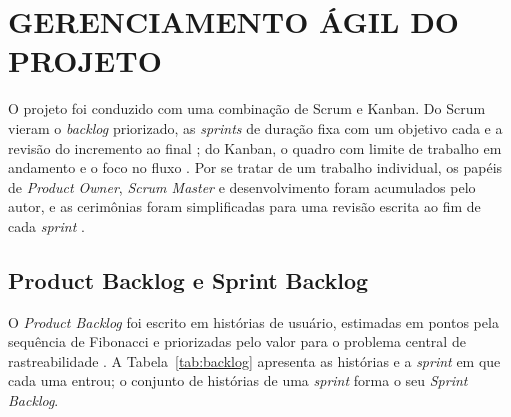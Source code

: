 \chapter{GERENCIAMENTO ÁGIL DO PROJETO}

O projeto foi conduzido com uma combinação de Scrum e Kanban. Do Scrum vieram o \textit{backlog} priorizado, as \textit{sprints} de duração fixa com um objetivo cada e a revisão do incremento ao final \cite{schwaber2020}; do Kanban, o quadro com limite de trabalho em andamento e o foco no fluxo \cite{anderson2011}. Por se tratar de um trabalho individual, os papéis de \textit{Product Owner}, \textit{Scrum Master} e desenvolvimento foram acumulados pelo autor, e as cerimônias foram simplificadas para uma revisão escrita ao fim de cada \textit{sprint} \cite{prikladnicki2014}.

\section{Product Backlog e Sprint Backlog}

O \textit{Product Backlog} foi escrito em histórias de usuário, estimadas em pontos pela sequência de Fibonacci e priorizadas pelo valor para o problema central de rastreabilidade \cite{sbrocco2012}. A Tabela~\ref{tab:backlog} apresenta as histórias e a \textit{sprint} em que cada uma entrou; o conjunto de histórias de uma \textit{sprint} forma o seu \textit{Sprint Backlog}.

